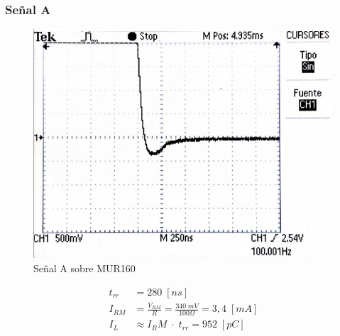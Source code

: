 \documentclass{article}
\begin{document}
\subsubsection{Señal A}
\begin{figure}[h!]
 \begin{center}
	\includegraphics[scale=0.4]{imagenes/MUR_A.jpg} 
	\caption{Señal A sobre MUR160}
 \end{center}
\end{figure}
\begin{align*}
	t_{rr} &= 280 \; [ns] \\
	I_{RM}	&= \frac{V_{RM}}{R} = \frac{340 \; mV}{100 \Omega} = 3,4 \; [mA] \\
	I_L	&\approx {I_RM} \; \cdot \; t_{rr} = 952 \; [pC]
\end{align*}
%
\end{document}
